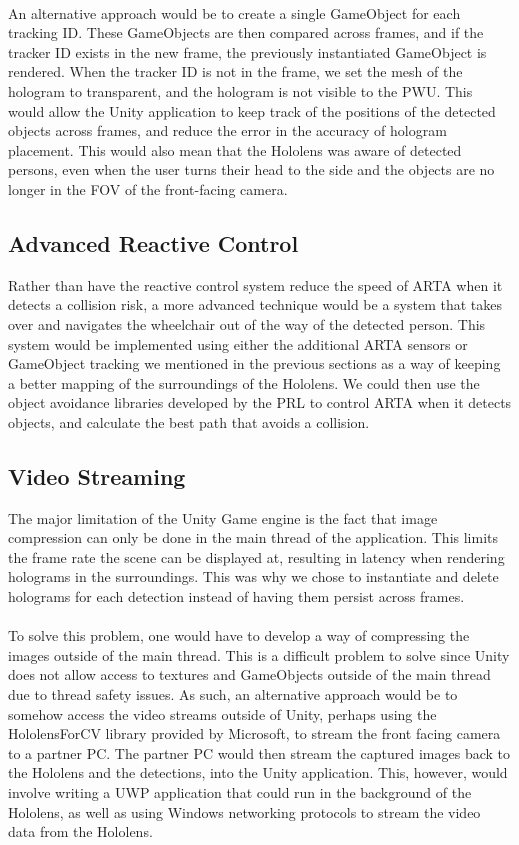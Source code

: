 \paragraph{} An alternative approach would be to create a single GameObject for each tracking ID. These GameObjects are then compared across frames, and if the tracker ID exists in the new frame, the previously instantiated GameObject is rendered. When the tracker ID is not in the frame, we set the mesh of the hologram to transparent, and the hologram is not visible to the PWU. This would allow the Unity application to keep track of the positions of the detected objects across frames, and reduce the error in the accuracy of hologram placement. This would also mean that the Hololens was aware of detected persons, even when the user turns their head to the side and the objects are no longer in the FOV of the front-facing camera.

\subsection{Advanced Reactive Control}
Rather than have the reactive control system reduce the speed of ARTA when it detects a collision risk, a more advanced technique would be a system that takes over and navigates the wheelchair out of the way of the detected person. This system would be implemented using either the additional ARTA sensors or GameObject tracking we mentioned in the previous sections as a way of keeping a better mapping of the surroundings of the Hololens. We could then use the object avoidance libraries developed by the PRL to control ARTA when it detects objects, and calculate the best path that avoids a collision.

\subsection{Video Streaming}
The major limitation of the Unity Game engine is the fact that image compression can only be done in the main thread of the application. This limits the frame rate the scene can be displayed at, resulting in latency when rendering holograms in the surroundings. This was why we chose to instantiate and delete holograms for each detection instead of having them persist across frames. 

\paragraph{}To solve this problem, one would have to develop a way of compressing the images outside of the main thread. This is a difficult problem to solve since Unity does not allow access to textures and GameObjects outside of the main thread due to thread safety issues. As such, an alternative approach would be to somehow access the video streams outside of Unity, perhaps using the HololensForCV library provided by Microsoft, to stream the front facing camera to a partner PC. The partner PC would then stream the captured images back to the Hololens and the detections, into the Unity application. This, however, would involve writing a UWP application that could run in the background of the Hololens, as well as using Windows networking protocols to stream the video data from the Hololens.

